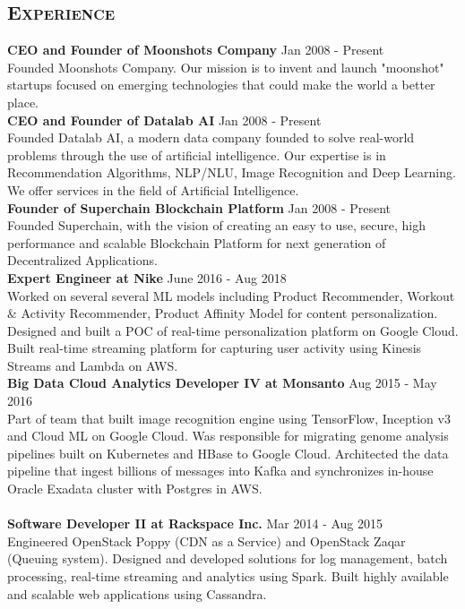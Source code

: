 \begin{resume}
\section{\textsc{Experience}}
\textbf{CEO and Founder of Moonshots Company} \hfill Jan 2008 - Present\\
Founded Moonshots Company. Our mission is to invent and launch "moonshot" startups focused on emerging technologies that could make the world a better place.\\
\textbf{CEO and Founder of Datalab AI} \hfill Jan 2008 - Present\\
Founded Datalab AI, a modern data company founded to solve real-world problems through the use of artificial intelligence. Our expertise is in Recommendation Algorithms, NLP/NLU, Image Recognition and Deep Learning. We offer services in the field of Artificial Intelligence. \\
\textbf{Founder of Superchain Blockchain Platform} \hfill Jan 2008 - Present\\
Founded Superchain, with the vision of creating an easy to use, secure, high performance and scalable Blockchain Platform for next generation of Decentralized Applications.\\
\textbf{Expert Engineer at Nike} \hfill June 2016 - Aug 2018\\
Worked on several several ML models including Product Recommender, Workout \& Activity Recommender, Product Affinity Model for content personalization. Designed and built a POC of real-time personalization platform on Google Cloud. Built real-time streaming platform for capturing user activity using Kinesis Streams and Lambda on AWS.\\
\textbf{Big Data Cloud Analytics Developer IV at Monsanto} \hfill Aug 2015 - May 2016\\
Part of team that built image recognition engine using TensorFlow, Inception v3 and Cloud ML on Google Cloud. Was responsible for migrating genome analysis pipelines built on Kubernetes and HBase to Google Cloud. Architected the data pipeline that ingest billions of messages into Kafka and synchronizes in-house Oracle Exadata cluster with Postgres in AWS.\\ \\
\textbf{Software Developer II at Rackspace Inc.} \hfill Mar 2014 - Aug 2015\\
Engineered OpenStack Poppy (CDN as a Service) and OpenStack Zaqar (Queuing system). Designed and developed solutions for log management, batch processing, real-time streaming and analytics using Spark. Built highly available and scalable web applications using Cassandra.\\

\end{resume}
